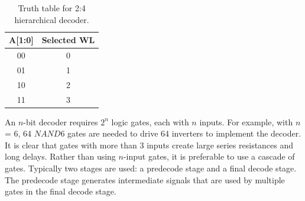  \begin{table}[h!] 
   \begin{center}
     \begin{tabular}{| c | c |}
     \hline
     A[1:0] & Selected WL\\ \hline
     00 & 0\\ \hline
     01 & 1\\ \hline
     10 & 2\\ \hline
     11 & 3\\ \hline

     \end{tabular}
   \end{center}
   \caption{Truth table for 2:4 hierarchical decoder.}
   \label{table:2-4 hierarchical_decoder}
 \end{table}


An $n$-bit decoder requires {$2^n$} logic gates, each with $n$ inputs. For example, with $n$ = 6, 
64 $NAND6$ gates are needed to drive 64 inverters to implement the decoder.
It is clear that gates with more than 3 inputs create large series resistances and long delays. 
Rather than using $n$-input gates, it is preferable to use a cascade of gates. 
Typically two stages are used: a predecode stage and a final decode stage. 
The predecode stage generates intermediate signals that are used 
by multiple gates in the final decode stage.



